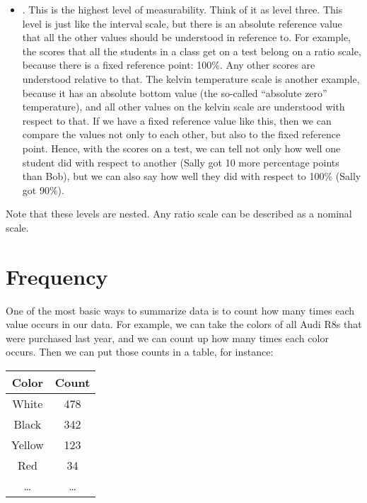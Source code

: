 \documentclass[../../../main.tex]{subfiles}
\begin{document}
\begin{itemize}
  \item {}. This is the highest level of measurability. Think of it as level three. This level is just like the interval scale, but there is an absolute reference value that all the other values should be understood in reference to. For example, the scores that all the students in a class get on a test belong on a ratio scale, because there is a fixed reference point: 100\%. Any other scores are understood relative to that. The kelvin temperature scale is another example, because it has an absolute bottom value (the so-called ``absolute zero'' temperature), and all other values on the kelvin scale are understood with respect to that. If we have a fixed reference value like this, then we can compare the values not only to each other, but also to the fixed reference point. Hence, with the scores on a test, we can tell not only how well one student did with respect to another (Sally got 10 more percentage points than Bob), but we can also say how well they did with respect to 100\% (Sally got 90\%).

\end{itemize}

Note that these levels are nested. Any ratio scale can be described as a nominal scale. 


\section{Frequency}

One of the most basic ways to summarize data is to count how many times each value occurs in our data. For example, we can take the colors of all Audi R8s that were purchased last year, and we can count up how many times each color occurs. Then we can put those counts in a table, for instance:

\begin{center}
  \begin{tabular}{| c | c |}
    \hline
    \textbf{Color} & \textbf{Count} \\
    \hline
    White & 478 \\
    \hline
    Black & 342 \\
    \hline
    Yellow & 123 \\
    \hline
    Red & 34 \\
    \hline
    \ldots & \ldots \\
    \hline
  \end{tabular}
\end{center}
\end{document}

